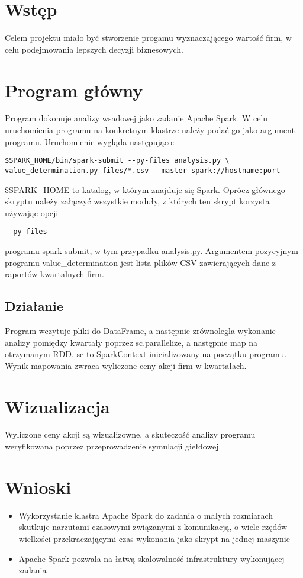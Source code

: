 \section{Wstęp}
Celem projektu miało być stworzenie progamu wyznaczającego wartość firm, w celu podejmowania
lepszych decyzji biznesowych.
\section{Program główny}
Program dokonuje analizy wsadowej jako zadanie Apache Spark.
W celu uruchomienia programu na konkretnym klastrze należy podać go jako argument programu.
Uruchomienie wygląda następująco:
\begin{verbatim}
$SPARK_HOME/bin/spark-submit --py-files analysis.py \
value_determination.py files/*.csv --master spark://hostname:port
\end{verbatim}
\$SPARK\_HOME to katalog, w którym znajduje się Spark.
Oprócz głównego skryptu należy załączyć wszystkie moduły, z których ten skrypt korzysta używając
opcji
\begin{verbatim}
--py-files
\end{verbatim}
programu spark-submit, w tym przypadku analysis.py.
Argumentem pozycyjnym programu value\_determination jest lista plików CSV zawierających dane z raportów
kwartalnych firm.
\subsection{Działanie}
Program wczytuje pliki do DataFrame, a następnie zrównolegla wykonanie analizy pomiędzy kwartały
poprzez sc.parallelize, a następnie map na otrzymanym RDD.
sc to SparkContext inicializowany na początku programu.
Wynik mapowania zwraca wyliczone ceny akcji firm w kwartałach.
\section{Wizualizacja}
Wyliczone ceny akcji są wizualizowne, a skuteczość analizy programu weryfikowana poprzez
przeprowadzenie symulacji giełdowej.
\section{Wnioski}
\begin{itemize}
	\item Wykorzystanie klastra Apache Spark do zadania o
	małych rozmiarach skutkuje narzutami czasowymi związanymi z komunikacją,
	o wiele rzędów wielkości przekraczającymi czas wykonania jako skrypt na jednej maszynie
	\item Apache Spark pozwala na łatwą skalowalność infrastruktury wykonującej zadania
\end{itemize}

